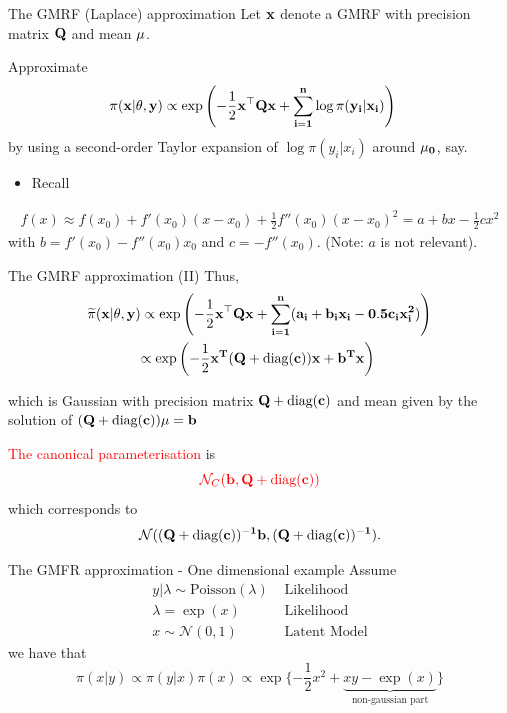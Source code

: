 \documentclass[
  ignorenonframetext,
]{beamer}
\providecommand{\tightlist}{%
  \setlength{\itemsep}{0pt}\setlength{\parskip}{0pt}}
\begin{document}
\begin{frame}{The GMRF (Laplace) approximation}
\protect\hypertarget{the-gmrf-laplace-approximation}{}
Let \(\bf{x}\) denote a GMRF with precision matrix \(\bf{Q}\) and mean
\(\bf{\mu}\).

Approximate \[
\begin{aligned}
\pi(\bf{x}|\theta,\bf{y}) &\propto
            \exp\left(-\frac{1}{2}\bf{x}^\top \bf{Q}\bf{x} + \sum_{i=1}^n \log \pi (y_i|x_i)\right)
\end{aligned}
\] by using a second-order Taylor expansion of \(\log \pi (y_i|x_i)\)
around \(\bf{\mu}_0\), say.

\begin{itemize}
\tightlist
\item
  Recall
\end{itemize}

\[
\begin{aligned}
        f(x) \approx f(x_0) + f'(x_0)(x-x_0)+ \frac{1}{2} f''(x_0)(x-x_0)^2
        = a+ bx - \frac{1}{2}cx^2
\end{aligned}
\] with \(b=f'(x_0) - f''(x_0)x_0\) and \(c = -f''(x_0)\). (Note: \(a\)
is not relevant).
\end{frame}

\begin{frame}{The GMRF approximation (II)}
\protect\hypertarget{the-gmrf-approximation-ii}{}
Thus, \[
\begin{aligned}
        \widetilde{\pi}(\bf{x}|\bf{\theta}, \bf{y}) &\propto
            \exp\left(-\frac{1}{2}\bf{x}^\top \bf{Q}\bf{x}  +
            \sum_{i=1}^n (a_i + b_i x_i - 0.5 c_i x_i^2)\right)\\
        &{\propto \exp\left(-\frac{1}{2}\bf{x}^T(\bf{Q} + \text{diag}(\bf{c})) \bf{x} + \bf{b}^T\bf{x}\right)}
\end{aligned}
\]

which is Gaussian with precision matrix \(\bf{Q} + \text{diag}(\bf{c})\)
and mean given by the solution of
\((\bf{Q} + \text{diag}(\bf{c}))\bf{\mu} = \bf{b}\)

\textcolor{red}{The canonical parameterisation} is \[
\textcolor{red}{\mathcal{N}_C(\mathbf{b}, \bf{Q} + \text{diag}(\bf{c}))}
\] which corresponds to \[
\mathcal{N}((\bf{Q} + \text{diag}(\bf{c}))^{-1}\mathbf{b}, (\bf{Q} + \text{diag}(\bf{c}))^{-1}).
\]
\end{frame}

\begin{frame}{The GMFR approximation - One dimensional example}
\protect\hypertarget{the-gmfr-approximation---one-dimensional-example}{}
Assume \[
\begin{aligned}
  y|\lambda \sim\text{Poisson}(\lambda)  & \text{ Likelihood}\\
  \lambda = \exp(x)  & \text{ Likelihood}\\
  x\sim\mathcal{N}(0,1) & \text{ Latent Model}
\end{aligned}
\] we have that \[
  \pi(x|y)\propto\pi(y|x)\pi(x)\propto\exp\{ -\frac{1}{2}x^2+
  \underbrace{xy-\exp(x)}_{\text{non-gaussian part}}
  \}
\]
\end{frame}
\end{document}
